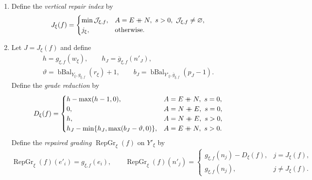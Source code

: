 \begin{definition}
\begin{enumerate}[font=\itshape]
\[\begin{cases}
 \max(q_{i-1}-1,0),&(Y'_\xi)_i\in N(Y'_\xi)
 \end{cases}
 \quad(i>r_\xi+2).
\]
Define
\[
 \mathcal J_{\xi,f}=\{j\in[|Y'_\xi|_N]_{\Z}:p_j>r_\xi+2,\ q_{p_j-1}=0\}.
\]
For $s=0$, let $\mathcal J_{\xi,f}=\varnothing$.
\item\label{d:adj-shell-repair-index} Define the \textit{vertical repair index} by
\[
 J_\xi(f)=\begin{cases}
 \min\mathcal J_{\xi,f},&A=E\mathbin{+\mkern-10mu+} N,\ s>0,\ \mathcal J_{\xi,f}\ne\varnothing,\\
 j_\xi,&\text{otherwise}.
 \end{cases}
\]
\item\label{d:adj-shell-repair-grading} Let $J=J_\xi(f)$ and define
\[
\begin{gathered}
 h=g_{\xi,f}(w_\xi),\qquad h_J=\overline g_{\xi,f}(n'_J),\\
 \vartheta=\operatorname{bBal}_{Y_\xi,g_{\xi,f}}(r_\xi)+1,\qquad
 b_J=\operatorname{bBal}_{Y'_\xi,\overline g_{\xi,f}}(p_J-1).
\end{gathered}
\]
Define the \textit{grade reduction} by
\[
 D_\xi(f)=\begin{cases}
 h-\max(h-1,0),&A=E\ccn N,\ s=0,\\
 0,&A=N\ccn E,\ s=0,\\
 h,&A=N\ccn E,\ s>0,\\
 h_J-\min\{h_J,\max(b_J-\vartheta,0)\},&A=E\ccn N,\ s>0.
 \end{cases}
\]
Define the \textit{repaired grading} $\operatorname{RepGr}_\xi(f)$ on $Y'_\xi$ by
\[
 \operatorname{RepGr}_\xi(f)(e'_i)=g_{\xi,f}(e_i),\qquad
 \operatorname{RepGr}_\xi(f)(n'_j)=
 \begin{cases}
 g_{\xi,f}(n_j)-D_\xi(f),&j=J_\xi(f),\\
 g_{\xi,f}(n_j),&j\ne J_\xi(f).
 \end{cases}
\]
\end{enumerate}
\end{definition}

